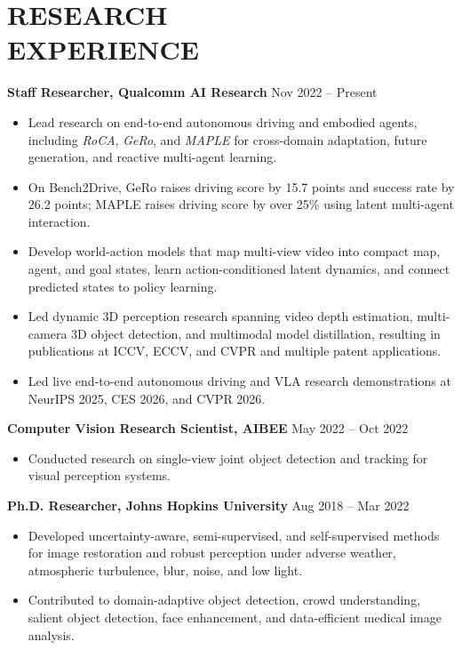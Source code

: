 \documentclass[margin,11pt]{resume}
\begin{document}
\section{\footnotesize {\normalsize R}ESEARCH\\ {\normalsize E}XPERIENCE}
{\bf Staff Researcher, Qualcomm AI Research} \hfill Nov 2022 -- Present\\
\vspace{-1.em}
\begin{itemize}[leftmargin=*,itemsep=0pt,topsep=0pt]
    \item Lead research on end-to-end autonomous driving and embodied agents, including \textit{RoCA}, \textit{GeRo}, and \textit{MAPLE} for cross-domain adaptation, future generation, and reactive multi-agent learning.
    \item On Bench2Drive, GeRo raises driving score by 15.7 points and success rate by 26.2 points; MAPLE raises driving score by over 25\% using latent multi-agent interaction.
    \item Develop world-action models that map multi-view video into compact map, agent, and goal states, learn action-conditioned latent dynamics, and connect predicted states to policy learning.
    \item Led dynamic 3D perception research spanning video depth estimation, multi-camera 3D object detection, and multimodal model distillation, resulting in publications at ICCV, ECCV, and CVPR and multiple patent applications.
    \item Led live end-to-end autonomous driving and VLA research demonstrations at NeurIPS 2025, CES 2026, and CVPR 2026.
\end{itemize}
\vspace{-.6em}
{\bf Computer Vision Research Scientist, AIBEE} \hfill May 2022 -- Oct 2022\\
\vspace{-1.em}
\begin{itemize}[leftmargin=*,itemsep=0pt,topsep=0pt]
    \item Conducted research on single-view joint object detection and tracking for visual perception systems.
\end{itemize}
{\bf Ph.D. Researcher, Johns Hopkins University} \hfill Aug 2018 -- Mar 2022\\
\vspace{-1.em}
\begin{itemize}[leftmargin=*,itemsep=0pt,topsep=0pt]
    \item Developed uncertainty-aware, semi-supervised, and self-supervised methods for image restoration and robust perception under adverse weather, atmospheric turbulence, blur, noise, and low light.
    \item Contributed to domain-adaptive object detection, crowd understanding, salient object detection, face enhancement, and data-efficient medical image analysis.
\end{itemize}
\end{document}
